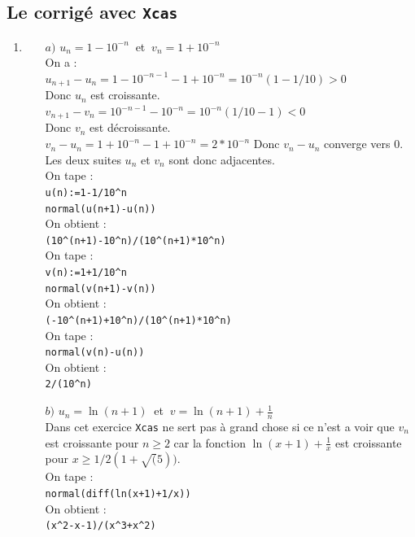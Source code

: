 \documentclass[a4paper,11pt]{book}
\begin{document}
\subsection{Le corrig\'e avec {\tt Xcas}}
\begin{enumerate}
\item \begin{itemize}
\item[$a)$] $u_n=1-10^{-n}\ $ et $\ v_n=1+10^{-n}$\\
On a :\\
$u_{n+1}-u_n=1-10^{-n-1}-1+10^{-n}=10^{-n}(1-1/10)>0$\\
Donc  $u_n$ est croissante.\\
$v_{n+1}-v_n=10^{-n-1}-10^{-n}=10^{-n}(1/10-1)<0$\\
Donc  $v_n$ est d\'ecroissante.\\
$v_n-u_n=1+10^{-n}-1+10^{-n}=2*10^{-n}$
Donc  $v_n-u_n$ converge vers 0.\\
Les deux suites $u_n$ et $v_n$ sont donc adjacentes.\\
On tape :\\
{\tt u(n):=1-1/10\verb|^|n}\\
{\tt normal(u(n+1)-u(n))}\\
On obtient :\\
{\tt (10\verb|^|(n+1)-10\verb|^|n)/(10\verb|^|(n+1)*10\verb|^|n)}\\
On tape :\\
{\tt v(n):=1+1/10\verb|^|n}\\
{\tt normal(v(n+1)-v(n))}\\
On obtient :\\
{\tt (-10\verb|^|(n+1)+10\verb|^|n)/(10\verb|^|(n+1)*10\verb|^|n)}\\
On tape :\\
{\tt normal(v(n)-u(n))}\\
On obtient :\\
{\tt 2/(10\verb|^|n)}
\item[$b)$] $u_n=\ln(n+1)\ $ et $\ \displaystyle v=\ln(n+1)+\frac{1}{n}$\\
Dans cet exercice {\tt Xcas} ne sert pas \`a grand chose si ce n'est a 
voir que  $v_n$ est croissante pour $n\geq 2$ car  la fonction 
$\ln(x+1)+\frac{1}{x}$ est croissante  pour $x\geq 1/2(1+\sqrt(5))$.\\ 
On tape :\\
{\tt normal(diff(ln(x+1)+1/x))}\\
On obtient :\\
{\tt (x\verb|^|2-x-1)/(x\verb|^|3+x\verb|^|2)}\\

\end{itemize}
\end{enumerate}
\end{document}
